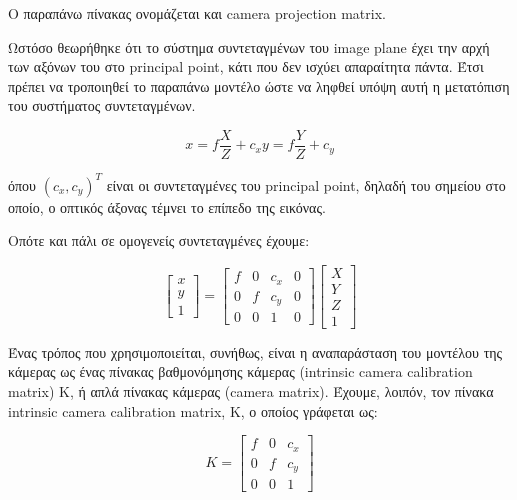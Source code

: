 Ο παραπάνω πίνακας ονομάζεται και camera projection matrix.



Ωστόσο θεωρήθηκε ότι το σύστημα συντεταγμένων του image plane έχει την αρχή των αξόνων του στο principal point, κάτι που δεν ισχύει απαραίτητα πάντα. Έτσι πρέπει να τροποιηθεί το παραπάνω μοντέλο ώστε να ληφθεί υπόψη αυτή η μετατόπιση του συστήματος συντεταγμένων.



\begin{equation}
x=f\frac{X}{Z}+c_{x} \! \!  y=f\frac{Y}{Z}+c_{y}
\end{equation}

όπου $(c_{x},c_{y})^{T}$ είναι οι συντεταγμένες του principal point, δηλαδή του σημείου στο οποίο, ο οπτικός άξονας τέμνει το επίπεδο της εικόνας. 

Οπότε και πάλι σε ομογενείς συντεταγμένες έχουμε:

\begin{equation}
\begin{bmatrix}
x\\y\\1
\end{bmatrix}
=
\begin{bmatrix}
f & 0 & c_{x} & 0\\
0 & f & c_{y} & 0\\
0 & 0 & 1 & 0
\end{bmatrix}
\begin{bmatrix}
X\\
Y\\
Z\\
1
\end{bmatrix}
\end{equation}

Ένας τρόπος που χρησιμοποιείται, συνήθως, είναι η αναπαράσταση του μοντέλου της κάμερας ως ένας πίνακας βαθμονόμησης κάμερας (intrinsic camera calibration matrix) K, ή απλά πίνακας κάμερας (camera matrix).  Έχουμε, λοιπόν, τον πίνακα intrinsic camera calibration matrix, Κ, ο οποίος γράφεται ως:


\begin{equation}
K=
\begin{bmatrix}
f & 0 & c_{x}\\
0 & f & c_{y}\\
0 & 0 & 1
\end{bmatrix}
\end{equation}



